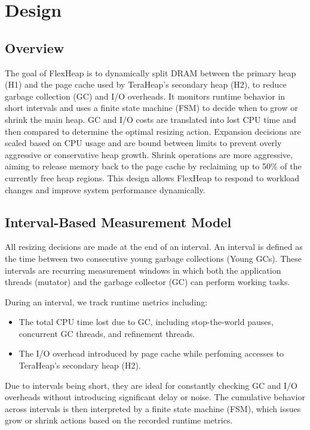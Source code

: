 \section{Design}

\subsection{Overview}

The goal of FlexHeap is to dynamically split DRAM between the primary heap (H1)
and the page cache used by TeraHeap’s secondary heap (H2), to reduce garbage collection (GC) 
and I/O overheads. It monitors runtime behavior in short intervals and uses a finite state machine 
(FSM) to decide when to grow or shrink the main heap. GC and I/O costs are translated into lost CPU time and then
compared to determine the optimal resizing action. Expansion decisions are scaled based on CPU 
usage and are bound between limits to prevent overly aggressive or conservative heap growth. Shrink operations are more aggressive, aiming to release memory back to the page cache 
by reclaiming up to 50\% of the currently free heap regions. This design allows FlexHeap to respond to workload changes and improve system performance dynamically.

\subsection{Interval-Based Measurement Model}

All resizing decisions are made at the end of an interval. An interval is defined as the time between 
two consecutive young garbage collections (Young GCs). These intervals are recurring 
measurement windows in which both the application threads (mutator) and the garbage collector (GC) can perform working tasks.

During an interval, we track runtime metrics including:
\begin{itemize}
  \item The total CPU time lost due to GC, including stop-the-world pauses, concurrent GC threads, and refinement threads.
  \item The I/O overhead introduced by page cache while perfoming accesses to TeraHeap's secondary heap (H2).
\end{itemize}

Due to intervals being short, they are ideal for constantly checking GC and I/O overheads 
without introducing significant delay or noise. The cumulative behavior across intervals is
then interpreted by a finite state machine (FSM), which issues grow or shrink 
actions based on the recorded runtime metrics.

